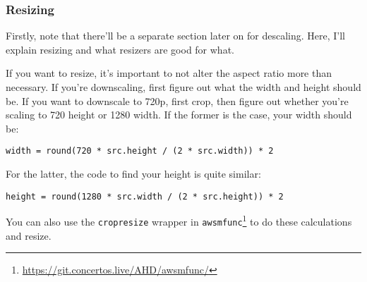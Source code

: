 \documentclass{scrartcl}
\begin{document}
\subsubsection{Resizing}


Firstly, note that there'll be a separate section later on for descaling.  Here, I'll explain resizing and what resizers are good for what.

If you want to resize, it's important to not alter the aspect ratio more than necessary.  If you're downscaling, first figure out what the width and height should be.  If you want to downscale to 720p, first crop, then figure out whether you're scaling to 720 height or 1280 width.  If the former is the case, your width should be:
\begin{lstlisting}
width = round(720 * src.height / (2 * src.width)) * 2
\end{lstlisting}
For the latter, the code to find your height is quite similar:
\begin{lstlisting}
height = round(1280 * src.width / (2 * src.height)) * 2
\end{lstlisting}

You can also use the \texttt{cropresize} wrapper in \texttt{awsmfunc}\footnote{\url{https://git.concertos.live/AHD/awsmfunc/}} to do these calculations and resize.
\end{document}
